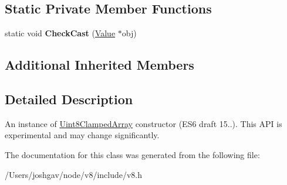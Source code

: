 \subsection*{Static Private Member Functions}
\begin{DoxyCompactItemize}
\item 
static void {\bfseries Check\+Cast} (\hyperlink{classv8_1_1_value}{Value} $\ast$obj)\hypertarget{classv8_1_1_uint8_clamped_array_a9f1ef355abd50168c2fc1ce02dae8d55}{}\label{classv8_1_1_uint8_clamped_array_a9f1ef355abd50168c2fc1ce02dae8d55}

\end{DoxyCompactItemize}
\subsection*{Additional Inherited Members}


\subsection{Detailed Description}
An instance of \hyperlink{classv8_1_1_uint8_clamped_array}{Uint8\+Clamped\+Array} constructor (E\+S6 draft 15..). This A\+PI is experimental and may change significantly. 

The documentation for this class was generated from the following file\+:\begin{DoxyCompactItemize}
\item 
/\+Users/joshgav/node/v8/include/v8.\+h\end{DoxyCompactItemize}
